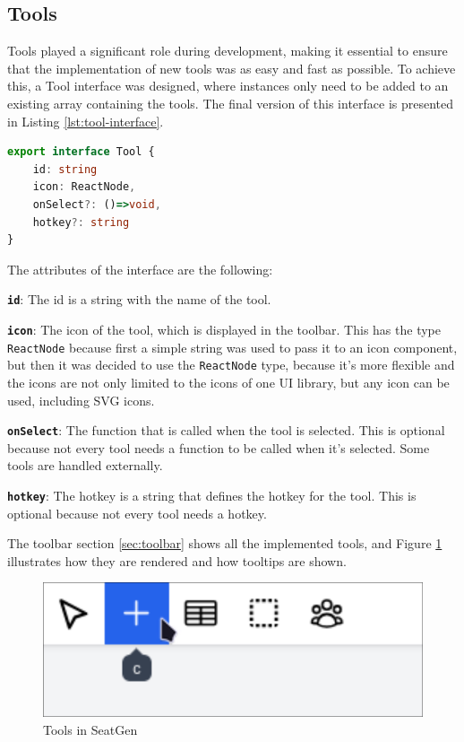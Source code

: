 \subsection{Tools}
Tools played a significant role during development, making it essential to ensure that the implementation of new tools was as easy and fast as possible. To achieve this, a Tool interface was designed, where instances only need to be added to an existing array containing the tools. The final version of this interface is presented in Listing \ref{lst:tool-interface}.

\begin{lstlisting}[language=TypeScript,caption={Tool Interface},label={lst:tool-interface}]
export interface Tool {
    id: string
    icon: ReactNode,
    onSelect?: ()=>void,
    hotkey?: string
}
\end{lstlisting}

The attributes of the interface are the following:
\begin{compactitem}
\item \texttt{\textbf{id}}: The id is a string with the name of the tool.
\item \texttt{\textbf{icon}}: The icon of the tool, which is displayed in the toolbar. This has the type \texttt{ReactNode} because first a simple string was used to pass it to an icon component, but then it was decided to use the \texttt{ReactNode} type, because it's more flexible and the icons are not only limited to the icons of one UI library, but any icon can be used, including SVG icons.
\item \texttt{\textbf{onSelect}}: The function that is called when the tool is selected. This is optional because not every tool needs a function to be called when it's selected. Some tools are handled externally.
\item \texttt{\textbf{hotkey}}: The hotkey is a string that defines the hotkey for the tool. This is optional because not every tool needs a hotkey.
\end{compactitem}

The toolbar section \ref{sec:toolbar} shows all the implemented tools, and Figure \ref{fig:tools} illustrates how they are rendered and how tooltips are shown.

\begin{figure}[H]
    \centering
    \includegraphics[scale=0.2]{pics/toolbar.png}
    \caption{Tools in SeatGen}
    \label{fig:tools}
\end{figure}


